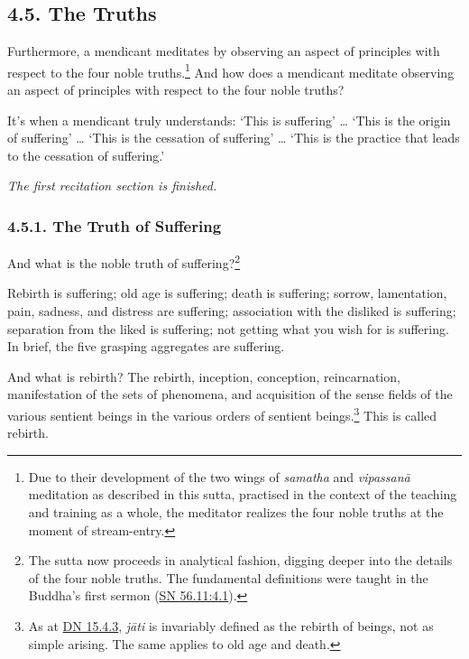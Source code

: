 \documentclass[12pt,openany]{book}%
\newcommand*{\scendsection}[1]{\begin{Center}\begin{small}\textit{#1}\end{small}\end{Center}\addvspace{1em}}
\begin{document}
\subsection*{4.5. The Truths }

Furthermore, a mendicant meditates by observing an aspect of principles with respect to the four noble truths.\footnote{Due to their development of the two wings of \textit{samatha} and \textit{\textsanskrit{vipassanā}} meditation as described in this sutta, practised in the context of the teaching and training as a whole, the meditator realizes the four noble truths at the moment of stream-entry. } And how does a mendicant meditate observing an aspect of principles with respect to the four noble truths? 

It’s when a mendicant truly understands: ‘This is suffering’ … ‘This is the origin of suffering’ … ‘This is the cessation of suffering’ … ‘This is the practice that leads to the cessation of suffering.’ 

\scendsection{The first recitation section is finished. }

\subsubsection*{4.5.1. The Truth of Suffering }

And what is the noble truth of suffering?\footnote{The sutta now proceeds in analytical fashion, digging deeper into the details of the four noble truths. The fundamental definitions were taught in the Buddha’s first sermon (\href{https://suttacentral.net/sn56.11/en/sujato\#4.1}{SN 56.11:4.1}). } 

Rebirth is suffering; old age is suffering; death is suffering; sorrow, lamentation, pain, sadness, and distress are suffering; association with the disliked is suffering; separation from the liked is suffering; not getting what you wish for is suffering. In brief, the five grasping aggregates are suffering. 

And what is rebirth? The rebirth, inception, conception, reincarnation, manifestation of the sets of phenomena, and acquisition of the sense fields of the various sentient beings in the various orders of sentient beings.\footnote{As at \href{https://suttacentral.net/dn15.4.3/en/sujato}{DN 15.4.3}, \textit{\textsanskrit{jāti}} is invariably defined as the rebirth of beings, not as simple arising. The same applies to old age and death. } This is called rebirth. 
\end{document}
